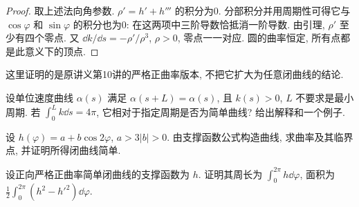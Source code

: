 \begin{proof}
取上述法向角参数. $\rho'=h'+h'''$ 的积分为0. 分部积分并用周期性可得它与 $\cos\varphi$ 和 $\sin\varphi$ 的积分也为0: 在这两项中三阶导数恰抵消一阶导数. 由引理, $\rho'$ 至少有四个零点. 又 $\dd k/\dd s=-\rho'/\rho^3$, $\rho>0$, 零点一一对应. 圆的曲率恒定, 所有点都是此意义下的顶点.
\end{proof}
这里证明的是原讲义第10讲的严格正曲率版本, 不把它扩大为任意闭曲线的结论.
\begin{exercise}\label{ex:2a}
设单位速度曲线 $\alpha(s)$ 满足 $\alpha(s+L)=\alpha(s)$, 且 $k(s)>0$, $L$ 不要求是最小周期. 若 $\int_0^L k\dd s=4\pi$, 它相对于指定周期是否为简单曲线? 给出解释和一个例子.
\end{exercise}
\begin{exercise}\label{ex:2b}
设 $h(\varphi)=a+b\cos2\varphi$, $a>3|b|>0$. 由支撑函数公式构造曲线, 求曲率及其临界点, 并证明所得闭曲线简单.
\end{exercise}
\begin{exercise}\label{ex:2c}
设正向严格正曲率简单闭曲线的支撑函数为 $h$. 证明其周长为 $\int_0^{2\pi}h\dd\varphi$, 面积为 $\frac12\int_0^{2\pi}(h^2-h'^2)\dd\varphi$.
\end{exercise}
